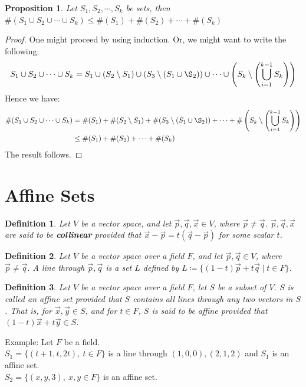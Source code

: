 \documentclass[11pt,oneside]{book}
\theoremstyle{break}
\theoremstyle{break}
\newtheorem{prop}[lem]{Proposition}
\newtheorem{defn}{Definition}[corL]
\newcommand{\example}{\color{green}Example: \color{black}}
\begin{document}
\begin{prop}
Let $S_1,S_2,\cdots, S_k$ be sets, then $\#(S_1\cup S_2\cup \cdots\cup S_k) \leq \#(S_1)+\#(S_2)+\cdots+\#(S_k)$
\end{prop}
\begin{proof}
One might proceed by using induction. Or, we might want to write the following:
$$S_1\cup S_2\cup \cdots \cup S_k = S_1 \cup (S_2\setminus S_1) \cup (S_3\setminus(S_1\cup\S_2))\cup \cdots \cup \left(S_k \setminus\left(\bigcup_{i=1}^{k-1} S_k\right)\right)$$
Hence we have:
\begin{align*}
\#(S_1\cup S_2\cup \cdots \cup S_k) &= \#(S_1) + \#(S_2\setminus S_1) + \#(S_3\setminus(S_1\cup\S_2))+ \cdots + \#\left(S_k \setminus\left(\bigcup_{i=1}^{k-1} S_k\right)\right) \\
&\leq \#(S_1)+\#(S_2)+\cdots+\#(S_k)
\end{align*}
The result follows.
\end{proof}



\newpage
\section[Affine Sets]{\color{red} Affine Sets \color{black}}
\begin{defn}
Let $V$ be a vector space, and let $\vec{p}, \vec{q}, \vec{x} \in V$, where $\vec{p}\neq \vec{q}$. $\vec{p}, \vec{q}, \vec{x}$ are said to be \textbf{collinear} provided that $\vec{x}-\vec{p} = t\left(\vec{q}-\vec{p}\right)$ for some scalar $t$. \end{defn}

\begin{defn}
Let $V$ be a vector space over a field $F$, and let $\vec{p}, \vec{q} \in V$, where $\vec{p}\neq \vec{q}$. A line through $\vec{p}, \vec{q}$ is a set $L$ defined by $L \coloneqq \{(1-t)\vec{p}+t\vec{q} \mid t \in F\}$. 
\end{defn}

\begin{defn}Let $V$ be a vector space over a field $F$, let $S$ be a subset of $V$. $S$ is called an affine set provided that $S$ contains all lines through any two vectors in $S$. That is, for $\vec{x},\vec{y} \in S$, and for $t\in F$, $S$ is said to be affine provided that $(1-t)\vec{x} + t\vec{y} \in S$. \end{defn}

\example Let $F$ be a field.\\
$S_1  = \{ (t+1,t,2t),\ t\in F\}$ is a line through $(1,0,0), (2,1,2)$ and $S_1$ is an affine set.\\
$S_2 = \{(x,y,3),\ x,y \in F\}$ is an affine set.\\
\end{document}
